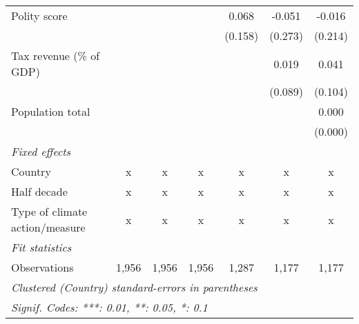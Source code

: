 \begin{tabular}{lcccccc}
   Polity score                                                          &         &         &               & 0.068          & -0.051        & -0.016\\   
                                                                         &         &         &               & (0.158)        & (0.273)       & (0.214)\\   
   Tax revenue (\% of GDP)                                               &         &         &               &                & 0.019         & 0.041\\   
                                                                         &         &         &               &                & (0.089)       & (0.104)\\   
   Population total                                                      &         &         &               &                &               & 0.000\\   
                                                                         &         &         &               &                &               & (0.000)\\   
   \emph{Fixed effects}\\
   Country                                                               & x       & x       & x             & x              & x             & x\\  
   Half decade                                                           & x       & x       & x             & x              & x             & x\\  
   Type of climate action/measure                                        & x       & x       & x             & x              & x             & x\\  
   \midrule \emph{Fit statistics}\\
   Observations                                                          & 1,956   & 1,956   & 1,956         & 1,287          & 1,177         & 1,177\\  
   \midrule
   \multicolumn{7}{l}{\emph{Clustered (Country) standard-errors in parentheses}}\\
   \multicolumn{7}{l}{\emph{Signif. Codes: ***: 0.01, **: 0.05, *: 0.1}}\\
\end{tabular}
\par\endgroup


